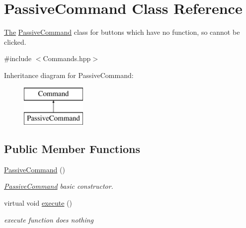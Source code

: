 \hypertarget{class_passive_command}{}\section{Passive\+Command Class Reference}
\label{class_passive_command}


\hyperlink{namespace_the}{The} \hyperlink{class_passive_command}{Passive\+Command} class for buttons which have no function, so cannot be clicked.  




{\ttfamily \#include $<$Commands.\+hpp$>$}

Inheritance diagram for Passive\+Command\+:\begin{figure}[H]
\begin{center}
\leavevmode
\includegraphics[height=2.000000cm]{class_passive_command}
\end{center}
\end{figure}
\subsection*{Public Member Functions}
\begin{DoxyCompactItemize}
\item 
\hypertarget{class_passive_command_adf0337c499a432a51bef5e61fdd65f50}{}\hyperlink{class_passive_command_adf0337c499a432a51bef5e61fdd65f50}{Passive\+Command} ()\label{class_passive_command_adf0337c499a432a51bef5e61fdd65f50}

\begin{DoxyCompactList}\small\item\em \hyperlink{class_passive_command}{Passive\+Command} basic constructor. \end{DoxyCompactList}\item 
\hypertarget{class_passive_command_a5c1df12a91f9f28f6bcd5bd73e4d48c3}{}virtual void \hyperlink{class_passive_command_a5c1df12a91f9f28f6bcd5bd73e4d48c3}{execute} ()\label{class_passive_command_a5c1df12a91f9f28f6bcd5bd73e4d48c3}

\begin{DoxyCompactList}\small\item\em execute function does nothing \end{DoxyCompactList}\end{DoxyCompactItemize}


